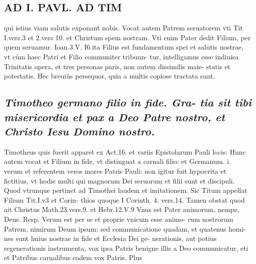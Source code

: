 \documentclass{article}
\begin{document}
\begin{pages}
\section*{AD I. PAVL. AD TIM }
\marginpar{[ p.4 ]}\pstart qui istius viam salutis exponant nobis. Vocat autem Patrem seruatorem vti Tit I.vers.3 et 2.vers 10. et Christum spem nostram. Vti enim Pater dedit Filium, per quem seruamur. Ioan.3.V. I6.ita Filius est fundamentum spei et salutis nostrae, vt cùm haec Patri et Filio communiter tribuun- tur, intelligamus esse indiuisa Trinitatis opera, et tres personas paris, non autem dissimilis maie- statis et potestatis. Hec breuiùs persequor, quia a multis copiose tractata sunt.  \pend
{}
{}
\subsection*{\textit{ Timotheo germano filio in fide. Gra- tia sit tibi misericordia et pax a Deo Patre nostro, et Christo Iesu Domino nostro. }}\pstart Timotheus quis fuerit apparet ex Act.16. et variis Epistolarum Pauli locis: Hunc autem vocat et Filium in fide, vt distinguat a carnali filio: et Germanum. i. verum et referentem veros mores Patris Pauli: non igitur fuit hypocrita et fictitius, vt hodie multi qui magnorum Dei seruorum et filii sunt et discipuli. Quod vtrunque pertinet ad Timothei laudem et imitationem.  \pend\pstart Sic Titum appellat Filium Tit.I.v3 et Corin- thios quoque I Corinth. 4. vers.14. Tamen obstat quod ait Christus Math.23.vers.9. et Hebr.12.V.9 Vnus est Pater animorum, nempe, Deus. Resp. Verum est per se et proprie vnicum esse animo- rum nostrorum Patrem, nimirum Deum ipsum: sed communicatione quadam, et quatenus homi- nes sunt huius nostrae in fide et Ecclesia Dei ge- nerationis, aut potius regenerationis instrumenta, vox ipsa Patris benigne illis a Deo communicatur, eti et Patribus carnalibus eadem vox Patris. Plus  \pend

\end{pages}
\end{document}
